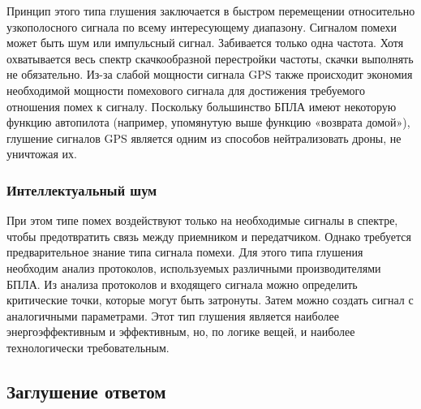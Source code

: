 Принцип этого типа глушения заключается в быстром перемещении относительно узкополосного сигнала по всему интересующему диапазону. Сигналом помехи может быть шум или импульсный сигнал. Забивается только одна частота. Хотя охватывается весь спектр скачкообразной перестройки частоты, скачки выполнять не обязательно. Из-за слабой мощности сигнала GPS также происходит экономия необходимой мощности помехового сигнала для достижения требуемого отношения помех к сигналу. Поскольку большинство БПЛА имеют некоторую функцию автопилота (например, упомянутую выше функцию «возврата домой»), глушение сигналов GPS является одним из способов нейтрализовать дроны, не уничтожая их.

\subsubsection{Интеллектуальный шум}

При этом типе помех воздействуют только на необходимые сигналы в спектре, чтобы предотвратить связь между приемником и передатчиком. Однако требуется предварительное знание типа сигнала помехи. Для этого типа глушения необходим анализ протоколов, используемых различными производителями БПЛА. Из анализа протоколов и входящего сигнала можно определить критические точки, которые могут быть затронуты. Затем можно создать сигнал с аналогичными параметрами. Этот тип глушения является наиболее энергоэффективным и эффективным, но, по логике вещей, и наиболее технологически требовательным.

\subsection{Заглушение ответом}